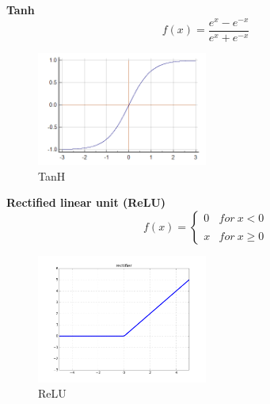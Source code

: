 \documentclass[letterpaper]{article}
\begin{document}
\textbf{Tanh}
$$f(x)=\frac{e^{x}-e^{-x}}{e^{x}+e^{-x}}$$
\begin{figure}[H]
\centering
\includegraphics[width=0.5\textwidth]{tanh.png}
\caption{\label{fig:frog}TanH}
\end{figure}

\textbf{Rectified linear unit (ReLU)\cite{nano4}}
$$f(x)=\left\{\begin{matrix}
0 & for\ x< 0\\ 
 & \\ 
x & for\ x\geq 0 
\end{matrix}\right.$$
\begin{figure}[H]
\centering
\includegraphics[width=0.5\textwidth]{RELU.png}
\caption{\label{fig:frog}ReLU}
\end{figure}
\end{document}

